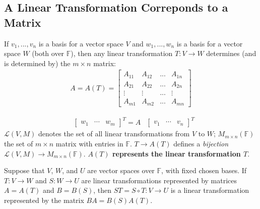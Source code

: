 \documentclass[11pt]{elegantbook}
\begin{document}
\subsection{A Linear Transformation Correponds to a Matrix}
\begin{corollary}[Corollary 2.4.16.]
    If $v_1,...,v_n$ is a basis for a vector space $V$ and $w_1,...,w_n$ is a basis for a vector space $W$ (both over $\mathbb{F}$), then any linear transformation $T : V \rightarrow W$ determines (and is determined by) the $m\times n$ matrix:
    \begin{equation}
        \begin{aligned}
            A=A(T)=\begin{bmatrix}
                A_{11}&	A_{12}&... &A_{1n}\\
                A_{21}&	A_{22}&... &A_{2n}\\
                \vdots&	\vdots&... &\vdots\\
                A_{m1}&	A_{m2}&... &A_{mn}
            \end{bmatrix}
        \end{aligned}
        \nonumber
    \end{equation}
\end{corollary}
\begin{equation}
    \begin{aligned}
        &\begin{bmatrix}
            w_1&\cdots	&w_m
        \end{bmatrix}^T=A
        &\begin{bmatrix}
                v_1&\cdots	&v_n
        \end{bmatrix}^T
    \end{aligned}
    \nonumber
\end{equation}
$\mathcal{L} (V,M)$ denotes the set of all linear transformations from $V$ to $W$; $M_{m\times n}(\mathbb{F})$ the set of $m\times n$ matrix with entries in $\mathbb{F}$. $T\rightarrow A(T)$ defines a \textit{bijection} $\mathcal{L} (V,M)\rightarrow M_{m\times n}(\mathbb{F})$. \textbf{$A(T)$ represents the linear transformation $T$}.


\begin{proposition}[Proposition 2.4.19]
    Suppose that $V$, $W$, and $U$ are vector spaces over $\mathbb{F}$, with fixed chosen bases. If
    $T : V \rightarrow W$ and $S : W \rightarrow U$ are linear transformations represented by matrices $A = A(T)$ and $B = B(S)$,
    then $ST = S \circ T : V \rightarrow U$ is a linear transformation represented by the matrix $BA = B(S)A(T)$.
\end{proposition}
\end{document}
